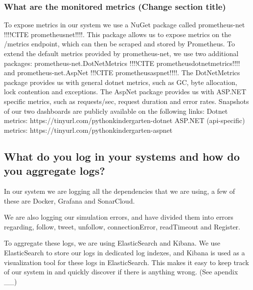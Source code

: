 \subsubsection{What are the monitored metrics (Change section title)}
To expose metrics in our system we use a NuGet package called prometheus-net !!!!CITE prometheusnet!!!!.
This package allows us to expose metrics on the /metrics endpoint, which can then be scraped and stored by Prometheus.
\newline
To extend the default metrics provided by prometheus-net, we use two additional packages: 
prometheus-net.DotNetMetrics !!!!CITE prometheusdotnetmetrics!!!! and prometheus-net.AspNet !!!CITE prometheusaspnet!!!!.
\newline
The DotNetMetrics package provides us with general dotnet metrics, such as GC, byte allocation, lock contention and exceptions.
\newline
The AspNet package provides us with ASP.NET specific metrics, such as requests/sec, request duration and error rates.
\newline
\newline
Snapshots of our two dashboards are publicly available on the following links:
\newline
Dotnet metrics: https://tinyurl.com/pythonkindergarten-dotnet
\newline
ASP.NET (api-specific) metrics: https://tinyurl.com/pythonkindergarten-aspnet

\subsection{What do you log in your systems and how do you aggregate logs?}
In our system we are logging all the dependencies that we are using, a few of these are Docker, Grafana and SonarCloud. 

We are also logging our simulation errors, and have divided them into errors regarding, follow, tweet, unfollow, connectionError, readTimeout and Register.

To aggregate these logs, we are using ElasticSearch and Kibana. We use ElasticSearch to store our logs in dedicated log indexes, and Kibana is used as a visualization tool for these logs in ElasticSearch. This makes it easy to keep track of our system in and quickly discover if there is anything wrong. (See apendix __) \newline

